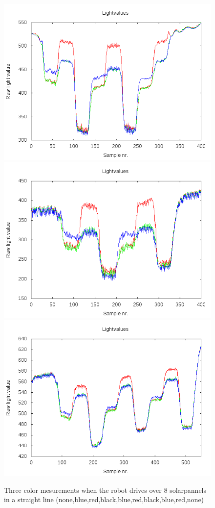 \begin{figure}[h]
  \centering
  \includegraphics[scale=0.342]{../experiments/2prototype/results/gnuplot/Colormesrun1.png}
  \includegraphics[scale=0.342]{../experiments/2prototype/results/gnuplot/Colormesrun2.png}
  \includegraphics[scale=0.34]{../experiments/2prototype/results/gnuplot/Colormesrun3.png}
  \caption{Three color mesurements when the robot drives over 8 solarpannels in a
straight line (none,blue,red,black,blue,red,black,blue,red,none)}
\end{figure}

